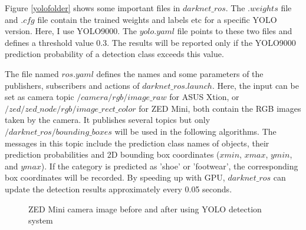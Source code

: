 Figure \ref{yolofolder} shows some important files in $darknet\_ros$. The $.weights$ file and $.cfg$ file contain the trained weights and labels etc for a specific YOLO version. Here, I use YOLO9000. The $yolo.yaml$ file points to these two files and defines a threshold value $0.3$. The results will be reported only if the YOLO9000 prediction probability of a detection class exceeds this value. 

The file named $ros.yaml$ defines the names and some parameters of the publishers, subscribers and actions of $darknet\_ros.launch$. Here, the input can be set as camera topic $/camera/rgb/image\_raw$ for ASUS Xtion, or $/zed\slash zed\_node\slash rgb\slash image\_rect\_color$ for ZED Mini, both contain the RGB images taken by the camera. It publishes several topics but only $/darknet\_ros/bounding\_boxes$ will be used in the following algorithms. The messages in this topic include the prediction class names of objects, their prediction probabilities and 2D bounding box coordinates ($xmin$, $xmax$, $ymin$, and $ymax$). If the category is predicted as 'shoe' or 'footwear', the corresponding box coordinates will be recorded. By speeding up with GPU, $darknet\_ros$ can update the detection results approximately every 0.05 seconds.

\begin{figure}[H]
\centering
{}
\caption{ZED Mini camera image before and after using YOLO detection system}
\label{5.2zed}
\end{figure}

